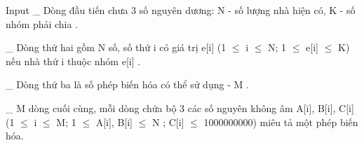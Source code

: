 Input
\_ Dòng đầu tiến chưa 3 số nguyên dương:   N   - số lượng nhà hiện có,   K   - số nhóm phải chia   .

   \_ Dòng thứ hai gồm   N   số, số thứ i có giá trị   e[i] (1  $\le$  i  $\le$  N; 1  $\le$  e[i]  $\le$  K)   nếu nhà thứ i thuộc nhóm   e[i]   .  

   \_ Dòng thứ ba là số phép biến hóa có thể sử dụng -   M   .  

   \_ M dòng cuối cùng, mỗi dòng chứa bộ 3 các số nguyên không âm   A[i], B[i], C[i] (1  $\le$  i  $\le$  M; 1  $\le$  A[i], B[i]  $\le$  N ; C[i]  $\le$  1000000000)   miêu tả một phép biến hóa.